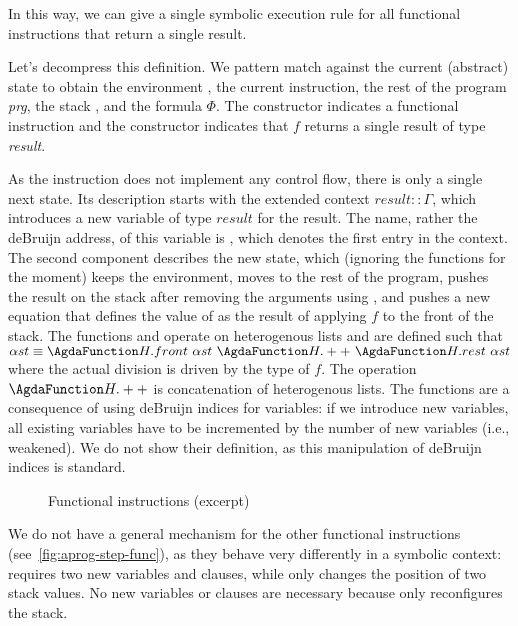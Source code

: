 In this way, we can give a single symbolic execution rule for all
functional instructions that return a single result.
\AbstractProgStepDOne

Let's decompress this definition. We pattern match against the current
(abstract) state to obtain the environment {\Aaen}, the current
instruction, the rest of the program \textit{prg}, the stack {\Aast}, and the formula $\Phi$. The
constructor  indicates a functional instruction and the
constructor  indicates that $f$ returns a single result of
type \emph{result}.

As the instruction does not implement any control flow, there is only
a single next state. Its description starts with the extended context
$result :: \Gamma$, which introduces a new variable of type $result$
for the result. The name, rather the deBruijn address, of this
variable is \AZERO, which denotes the first entry in the context. The
second component describes the new state, which (ignoring the
 functions for the moment) keeps the environment, moves to
the rest of the program, pushes the result on the stack after removing
the arguments using , and pushes a new equation that
defines the value of {\AZERO} as the result of applying $f$ to the
front of the stack.
The functions  and  operate on heterogenous
lists and are defined such that
$\Aast \equiv \AFun{H.front}~\Aast~\AFun{H.++}~\AFun{H.rest}~\Aast$ where
the actual division is driven by the type of $f$. The operation
$\AFun{H.++}$ is concatenation of heterogenous lists.
The  functions are a consequence of using deBruijn indices
for variables: if we introduce new variables, all existing variables
have to be incremented by the number of new variables (i.e.,
weakened). We do not show their definition, 
as this manipulation of deBruijn indices is standard.


\begin{figure}[tp]
  \AbstractProgStepUNPAIR
  \AbstractProgStepSWAP
  \AbstractProgStepPUSH
  \caption{Functional instructions (excerpt)}
  \label{fig:aprog-step-func}
\end{figure}

\begin{comment}
  The matching representing the stack can be split implicitly just
  like the stack interpretation during concrete execution.  \verb/n∈/
  is another Agda pattern synonym for the n'th element of the context.
  Whenever the context is extended during symbolic execution, all
  elements of the abstract program state that do not change must be
  weakened so they can be parameterized by the new context.
\end{comment}
We do not have a general mechanism for the other functional
instructions (see~\autoref{fig:aprog-step-func}), as they behave very differently in a symbolic context:
 requires two new variables and clauses, while
 only changes the position of two stack values.
No new variables or clauses are necessary because  only
reconfigures the stack.

